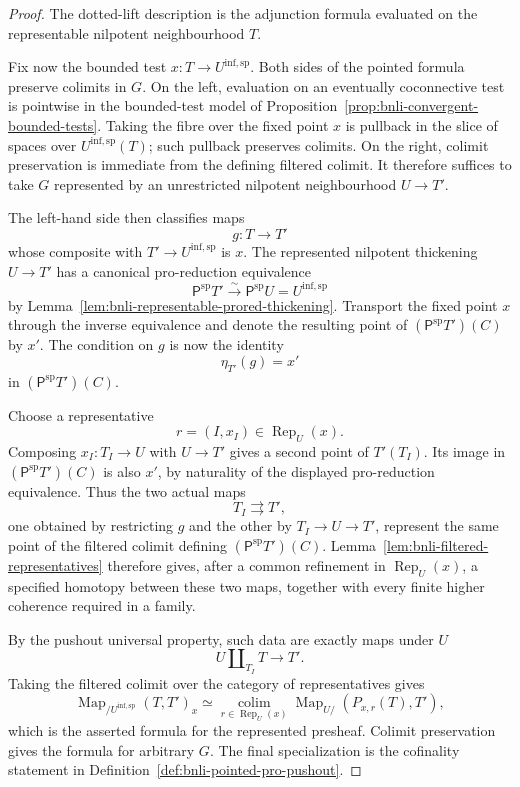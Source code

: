 \begin{proof}
The dotted-lift description is the adjunction formula evaluated on the
representable nilpotent neighbourhood $T$.

Fix now the bounded test $x:T\to U^{\mathrm{inf,sp}}$.  Both sides of the
pointed formula preserve colimits in $G$.  On the left, evaluation on an
eventually coconnective test is pointwise in the bounded-test model of
Proposition~\ref{prop:bnli-convergent-bounded-tests}.  Taking the fibre over
the fixed point $x$ is pullback in the slice of spaces over
$U^{\mathrm{inf,sp}}(T)$; such pullback preserves colimits.  On the right,
colimit preservation is immediate from the defining filtered colimit.  It therefore suffices to take $G$ represented by an
unrestricted nilpotent neighbourhood $U\to T'$.

The left-hand side then classifies maps
\[
    g:T\longrightarrow T'
\]
whose composite with $T'\to U^{\mathrm{inf,sp}}$ is $x$.  The represented
nilpotent thickening $U\to T'$ has a canonical pro-reduction equivalence
\[
\boxed{
    \mathsf P^{\mathrm{sp}}T'
    \xrightarrow{\sim}
    \mathsf P^{\mathrm{sp}}U
    =U^{\mathrm{inf,sp}}}
\]
by Lemma~\ref{lem:bnli-representable-prored-thickening}.  Transport the fixed
point $x$ through the inverse equivalence and denote the resulting point of
$(\mathsf P^{\mathrm{sp}}T')(C)$ by $x'$.  The condition on $g$ is now the
identity
\[
    \eta_{T'}(g)=x'
\]
in $(\mathsf P^{\mathrm{sp}}T')(C)$.

Choose a representative
\[
    r=(I,x_I)\in\operatorname{Rep}_{U}(x).
\]
Composing $x_I:T_I\to U$ with $U\to T'$ gives a second point of $T'(T_I)$.
Its image in $(\mathsf P^{\mathrm{sp}}T')(C)$ is also $x'$, by naturality of
the displayed pro-reduction equivalence.  Thus the two actual maps
\[
    T_I\rightrightarrows T',
\]
one obtained by restricting $g$ and the other by $T_I\to U\to T'$, represent
the same point of the filtered colimit defining
$(\mathsf P^{\mathrm{sp}}T')(C)$.  Lemma~\ref{lem:bnli-filtered-representatives}
therefore gives, after a common refinement in $\operatorname{Rep}_U(x)$, a
specified homotopy between these two maps, together with every finite higher
coherence required in a family.

By the pushout universal property, such data are exactly maps under $U$
\[
    U\amalg_{T_I}T
    \longrightarrow T'.
\]
Taking the filtered colimit over the category of representatives gives
\[
    \operatorname{Map}_{/U^{\mathrm{inf,sp}}}(T,T')_x
    \simeq
    \operatorname*{colim}_{r\in\operatorname{Rep}_{U}(x)}
    \operatorname{Map}_{U/}(P_{x,r}(T),T'),
\]
which is the asserted formula for the represented presheaf.  Colimit
preservation gives the formula for arbitrary $G$.  The final specialization is
the cofinality statement in
Definition~\ref{def:bnli-pointed-pro-pushout}.
\end{proof}

